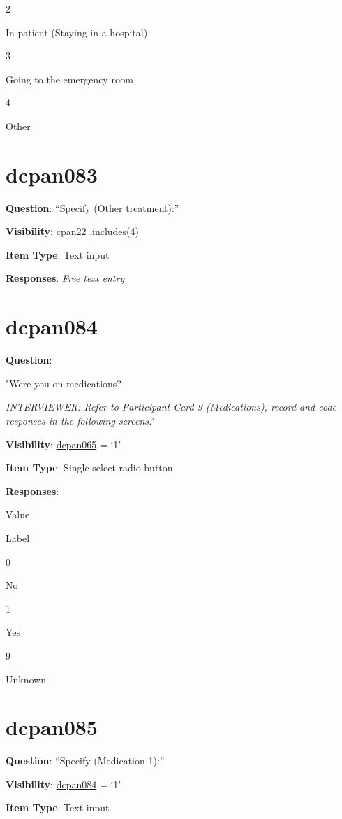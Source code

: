 \documentclass[]{book}
\begin{document}
2

In-patient (Staying in a hospital)

3

Going to the emergency room

4

Other

\hypertarget{dcpan083}{%
\section{dcpan083}\label{dcpan083}}

\textbf{Question}: ``Specify (Other treatment):''

\textbf{Visibility}: \protect\hyperlink{cpan22}{cpan22} .includes(4)

\textbf{Item Type}: Text input

\textbf{Responses}: \emph{Free text entry}

\hypertarget{dcpan084}{%
\section{dcpan084}\label{dcpan084}}

\textbf{Question}:

"Were you on medications?

\emph{INTERVIEWER: Refer to Participant Card 9 (Medications), record and code responses in the following screens.}"

\textbf{Visibility}: \protect\hyperlink{dcpan065}{dcpan065} = `1'

\textbf{Item Type}: Single-select radio button

\textbf{Responses}:

Value

Label

0

No

1

Yes

9

Unknown

\hypertarget{dcpan085}{%
\section{dcpan085}\label{dcpan085}}

\textbf{Question}: ``Specify (Medication 1):''

\textbf{Visibility}: \protect\hyperlink{dcpan084}{dcpan084} = `1'

\textbf{Item Type}: Text input
\end{document}
